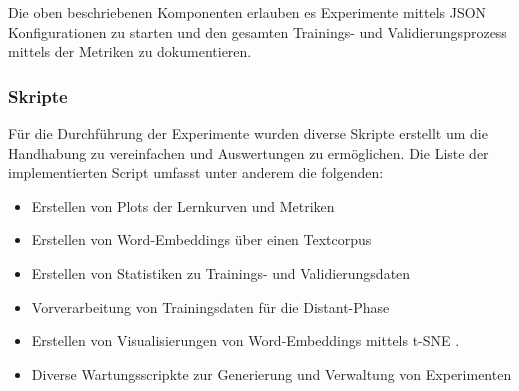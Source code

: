 Die oben beschriebenen Komponenten erlauben es Experimente mittels JSON Konfigurationen zu starten und den gesamten Trainings- und Validierungsprozess mittels der Metriken zu dokumentieren.

\subsubsection{Skripte}
\label{technical_setup:scripts}
Für die Durchführung der Experimente wurden diverse Skripte erstellt um die Handhabung zu vereinfachen und Auswertungen zu ermöglichen. Die Liste der implementierten Script umfasst unter anderem die folgenden:

\begin{itemize}[noitemsep]
	\item Erstellen von Plots der Lernkurven und Metriken
	\item Erstellen von Word-Embeddings über einen Textcorpus
	\item Erstellen von Statistiken zu Trainings- und Validierungsdaten
	\item Vorverarbeitung von Trainingsdaten für die Distant-Phase
	\item Erstellen von Visualisierungen von Word-Embeddings mittels t-SNE \cite{maaten2008visualizing}.
	\item Diverse Wartungsscripkte zur Generierung und Verwaltung von Experimenten
\end{itemize}

